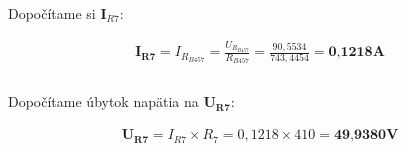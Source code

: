 \noindent Dopočítame si $\boldsymbol I_{R7}$:

\begin{gather*}
    \boldsymbol{I_{R7}} = I_{R_{B457}} = \frac{U_{R_{B457}}}{R_{B457}} =
    \frac{90,5534}{743,4454} =
    \textbf{0,1218A} \\\\
\end{gather*}

\noindent Dopočítame úbytok napätia na $\boldsymbol{U_{R7}}$:

\begin{gather*}
    \boldsymbol{U_{R7}} = I_{R7} \times R_7 = 0,1218 \times 410 = \textbf{49,9380V}
\end{gather*}






